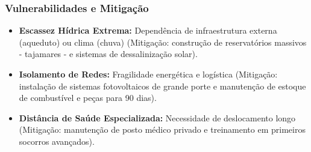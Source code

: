 \subsubsection{Vulnerabilidades e
Mitigação}

\begin{itemize}
\tightlist
\item
  \textbf{Escassez Hídrica Extrema:} Dependência de infraestrutura
  externa (aqueduto) ou clima (chuva) (Mitigação: construção de
  reservatórios massivos - tajamares - e sistemas de dessalinização
  solar).
\item
  \textbf{Isolamento de Redes:} Fragilidade energética e logística
  (Mitigação: instalação de sistemas fotovoltaicos de grande porte e
  manutenção de estoque de combustível e peças para 90 dias).
\item
  \textbf{Distância de Saúde Especializada:} Necessidade de deslocamento
  longo (Mitigação: manutenção de posto médico privado e treinamento em
  primeiros socorros avançados).
\end{itemize}

